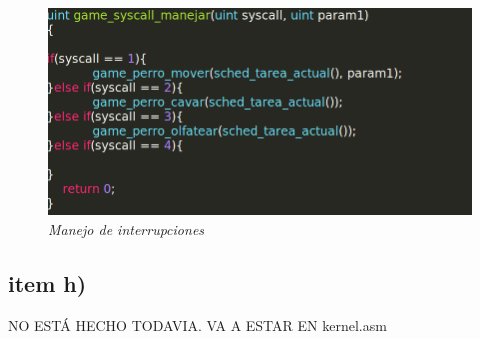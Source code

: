 \begin{figure}[H]
\begin{center}
\includegraphics[width=\linewidth]{ejercicio6/syscall_manejar.png}
\caption{{\small \textit{Manejo de interrupciones}}}
\endminipage
\end{center}
\end{figure}

 \subsection{item h)}
 NO ESTÁ HECHO TODAVIA. VA A ESTAR EN kernel.asm